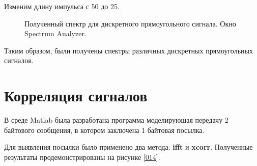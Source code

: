 \documentclass[a4paper,14pt]{extarticle}
\begin{document}
Изменим длину импульса с 50 до 25.

\begin{figure}[H]
\caption{Полученный спектр для дискретного прямоугольного 
сигнала. Окно Spectrum Analyzer.}
\label{013}
\end{figure}

Таким образом, были получены спектры различных дискретных 
прямоугольных сигналов.

\section{Корреляция сигналов}

В среде Matlab была разработана программа моделирующая передачу 2 байтового сообщения, в котором заключена 1 байтовая посылка.

Для выявления посылки было применено два метода: \textbf{ifft} и \textbf{xcorr}. Полученные результаты продемонстрированы на рисунке \ref{014}.
\end{document}
